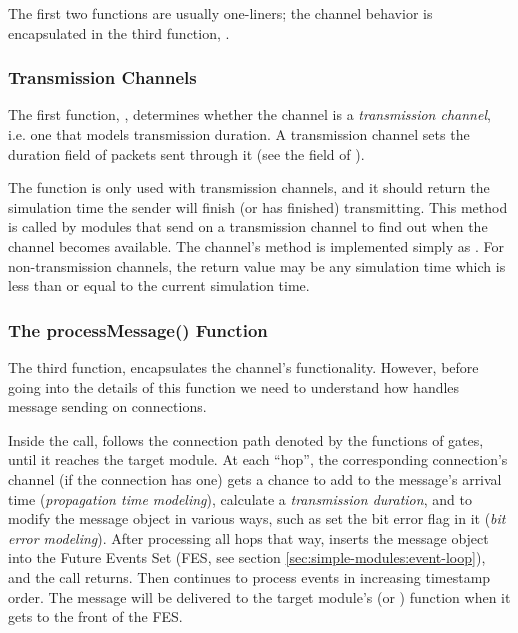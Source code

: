 \begin{ned}
The first two functions are usually one-liners; the channel behavior is
encapsulated in the third function, .

\subsubsection{Transmission Channels}
\label{sec:simple-modules:transmission-channels}

The first function, , determines whether
the channel is a \textit{transmission channel}, i.e. one that models
transmission duration. A transmission channel sets the duration field of
packets sent through it (see the  field of
).

The  function is only used with
transmission channels, and it should return the simulation time the sender
will finish (or has finished) transmitting. This method is called by
modules that send on a transmission channel to find out when the channel
becomes available. The channel's  method is implemented
simply as . For
non-transmission channels, the  return
value may be any simulation time which is less than or equal to the current
simulation time.

\subsubsection{The processMessage() Function}
\label{sec:simple-modules:channel-processmessage}

The third function,  encapsulates the channel's
functionality. However, before going into the details of this function
we need to understand how {\opp} handles message sending on connections.

Inside the  call, {\opp} follows the
connection path denoted by the  functions of gates,
until it reaches the target module. At each ``hop'', the corresponding
connection's channel (if the connection has one) gets a chance to add to
the message's arrival time (\textit{propagation time modeling}), calculate a
\textit{transmission duration}, and to modify the message object in various
ways, such as set the bit error flag in it (\textit{bit error modeling}).
After processing all hops that way, {\opp} inserts the message object
into the Future Events Set (FES, see section
\ref{sec:simple-modules:event-loop}), and the  call returns.
Then {\opp} continues to process events in increasing timestamp order.
The message will be delivered to the target module's 
(or ) function when it gets to the front of the FES.


\end{ned}
